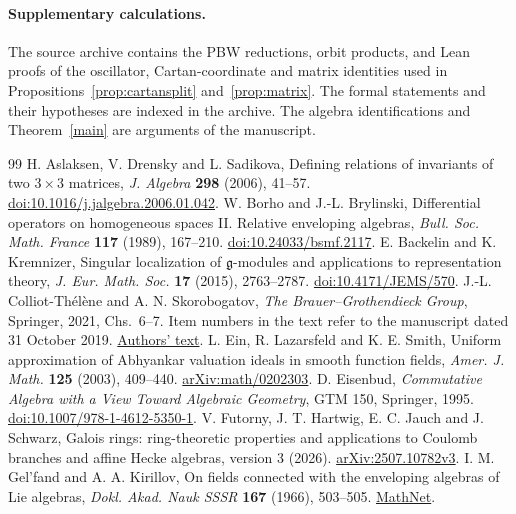 \documentclass[11pt,a4paper]{article}
\theoremstyle{definition}
\begin{document}
\paragraph{Supplementary calculations.}
The source archive contains the PBW reductions, orbit products, and Lean proofs of the oscillator, Cartan-coordinate and matrix identities used in Propositions~\ref{prop:cartansplit} and~\ref{prop:matrix}. The formal statements and their hypotheses are indexed in the archive. The algebra identifications and Theorem~\ref{main} are arguments of the manuscript.
\begin{thebibliography}{99}
\small
{} H. Aslaksen, V. Drensky and L. Sadikova,
Defining relations of invariants of two \(3\times3\) matrices,
\emph{J. Algebra} \textbf{298} (2006), 41--57.
\href{https://doi.org/10.1016/j.jalgebra.2006.01.042}{doi:10.1016/j.jalgebra.2006.01.042}.
 W. Borho and J.-L. Brylinski, Differential operators on homogeneous spaces II. Relative enveloping algebras, \emph{Bull. Soc. Math. France} \textbf{117} (1989), 167--210. \href{https://doi.org/10.24033/bsmf.2117}{doi:10.24033/bsmf.2117}.
 E. Backelin and K. Kremnizer,
Singular localization of \(\mathfrak g\)-modules and applications to representation theory,
\emph{J. Eur. Math. Soc.} \textbf{17} (2015), 2763--2787.
\href{https://doi.org/10.4171/JEMS/570}{doi:10.4171/JEMS/570}.
 J.-L. Colliot-Thélène and A. N. Skorobogatov,
\emph{The Brauer--Grothendieck Group}, Springer, 2021, Chs.~6--7. Item numbers in the text refer to the manuscript dated 31 October 2019.
\href{https://www.imo.universite-paris-saclay.fr/~jean-louis.colliot-thelene/BGgroup_book.pdf}{Authors' text}.
 L. Ein, R. Lazarsfeld and K. E. Smith, Uniform approximation of Abhyankar valuation ideals in smooth function fields, \emph{Amer. J. Math.} \textbf{125} (2003), 409--440. \href{https://arxiv.org/abs/math/0202303}{arXiv:math/0202303}.
 D. Eisenbud, \emph{Commutative Algebra with a View Toward Algebraic Geometry}, GTM 150, Springer, 1995. \href{https://doi.org/10.1007/978-1-4612-5350-1}{doi:10.1007/978-1-4612-5350-1}.
 V. Futorny, J. T. Hartwig, E. C. Jauch and J. Schwarz,
Galois rings: ring-theoretic properties and applications to Coulomb branches and affine Hecke algebras, version 3 (2026).
\href{https://arxiv.org/abs/2507.10782v3}{arXiv:2507.10782v3}.
 I. M. Gel'fand and A. A. Kirillov,
On fields connected with the enveloping algebras of Lie algebras,
\emph{Dokl. Akad. Nauk SSSR} \textbf{167} (1966), 503--505.
\href{https://www.mathnet.ru/eng/dan32159}{MathNet}.

\end{thebibliography}
\end{document}

